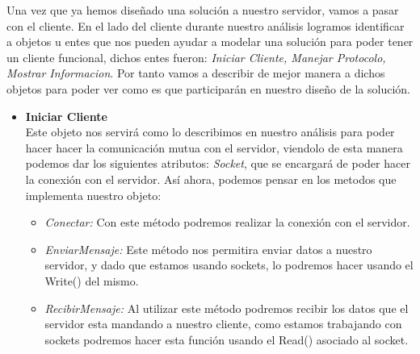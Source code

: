 \documentclass[10pt,letterpaper]{report}
\begin{document}
\vspace{0.5cm}
\noindent Una vez que ya hemos diseñado una solución a nuestro servidor, vamos a pasar con el cliente.
\noindent En el lado del cliente durante nuestro análisis logramos identificar a objetos u entes que nos pueden ayudar a modelar una solución para poder tener un cliente funcional, dichos entes fueron: \textit{Iniciar Cliente, Manejar Protocolo, Mostrar Informacion}.
Por tanto vamos a describir de mejor manera a dichos objetos para poder ver como es que participarán en nuestro diseño de la solución.
    \begin{itemize}

        \item[-] \textbf{Iniciar Cliente}\\
        \noindent Este objeto nos servirá como lo describimos en nuestro análisis para poder hacer hacer la comunicación mutua con el servidor, viendolo de esta manera podemos dar los siguientes atributos: \textit{Socket}, que se encargará de poder hacer la conexión con el servidor.
        Así ahora, podemos pensar en los metodos que implementa nuestro objeto:

             \begin{itemize}
                \item[-] {\textit{Conectar:}} Con este método podremos realizar la conexión con el servidor.
                \item[-] {\textit{EnviarMensaje:}} Este método nos permitira enviar datos a nuestro servidor, y dado que estamos usando sockets, lo podremos hacer usando el Write() del mismo.
                \item[-] {\textit{RecibirMensaje:}} Al utilizar este método podremos recibir los datos que el servidor esta mandando a nuestro cliente, como estamos trabajando con sockets podremos hacer esta función usando el Read() asociado al socket.
            \end{itemize}


\end{itemize}
\end{document}
